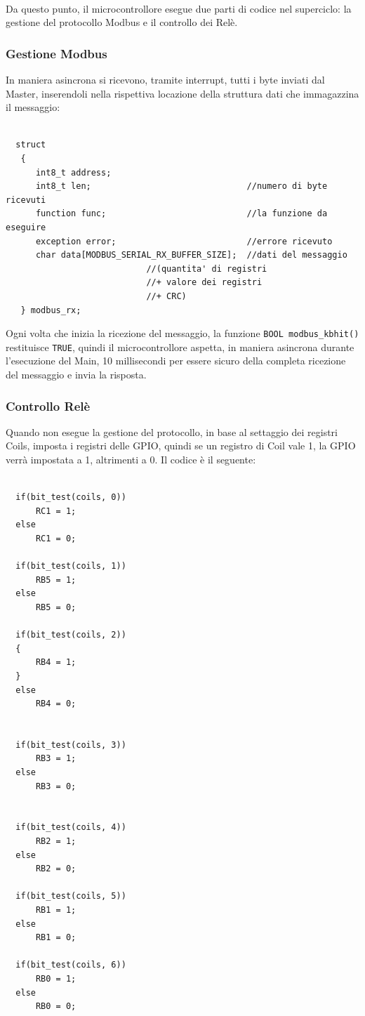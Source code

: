\documentclass[a4paper,titlepage]{book}
\begin{document}
~

Da questo punto, il microcontrollore esegue due parti di codice nel superciclo: la gestione del protocollo Modbus e il controllo dei Relè.

\subsubsection{Gestione Modbus}

In maniera asincrona si ricevono, tramite interrupt, tutti i byte inviati dal Master, inserendoli nella rispettiva locazione della struttura dati che immagazzina il messaggio:

\begin{lstlisting}

  struct
   {
      int8_t address;
      int8_t len;                              	//numero di byte ricevuti
      function func;                           	//la funzione da eseguire
      exception error;                         	//errore ricevuto
      char data[MODBUS_SERIAL_RX_BUFFER_SIZE]; 	//dati del messaggio 
      						//(quantita' di registri 
      						//+ valore dei registri
      						//+ CRC)
   } modbus_rx;

\end{lstlisting}

Ogni volta che inizia la ricezione del messaggio, la funzione \lstinline!BOOL modbus_kbhit()! restituisce \lstinline!TRUE!, quindi il microcontrollore aspetta, in maniera asincrona durante l'esecuzione del Main, 10 millisecondi per essere sicuro della completa ricezione del messaggio e invia la risposta.

\subsubsection{Controllo Relè}

Quando non esegue la gestione del protocollo, in base al settaggio dei registri Coils, imposta i registri delle GPIO, quindi se un registro di Coil vale 1, la GPIO verrà impostata a 1, altrimenti a 0. Il codice è il seguente:

\begin{lstlisting}

  if(bit_test(coils, 0))
      RC1 = 1;
  else
      RC1 = 0;

  if(bit_test(coils, 1))
      RB5 = 1;
  else
      RB5 = 0;

  if(bit_test(coils, 2))
  {
      RB4 = 1;
  }
  else
      RB4 = 0;


  if(bit_test(coils, 3))
      RB3 = 1;
  else
      RB3 = 0;


  if(bit_test(coils, 4))
      RB2 = 1;
  else
      RB2 = 0;

  if(bit_test(coils, 5))
      RB1 = 1;
  else
      RB1 = 0;

  if(bit_test(coils, 6))
      RB0 = 1;
  else
      RB0 = 0;

\end{lstlisting}
\end{document}
